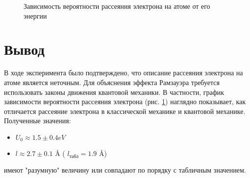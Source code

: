 \documentclass[12pt,a4paper]{article}
\begin{document}
\begin{enumerate}
\begin{figure}[ht!]\label{omega} 
\caption{Зависимость вероятности рассеяния электрона на атоме от его энергии}
\end{figure}
 
\end{enumerate}

\section{Вывод}

В ходе эксперимента было подтверждено, что описание рассеяния электрона на атоме является неточным. Для объяснения эффекта Рамзауэра требуется использовать законы движения квантовой механики. В частности, график зависимости вероятности рассеяния электрона (рис. \ref{omega}) наглядно показывает, как отличается рассеяние электрона в классической механике и квантовой механике.
Полученные значения:
\begin{itemize}
\item $U_0 \approx 1.5 \pm 0.4 eV$ 
\item $l \approx 2.7 \pm 0.1$ {\AA} ( $l_\text{табл} = 1.9$ {\AA})
\end{itemize}
имеют "разумную" величину или совпадают по порядку с табличным значением. 
\end{document}
